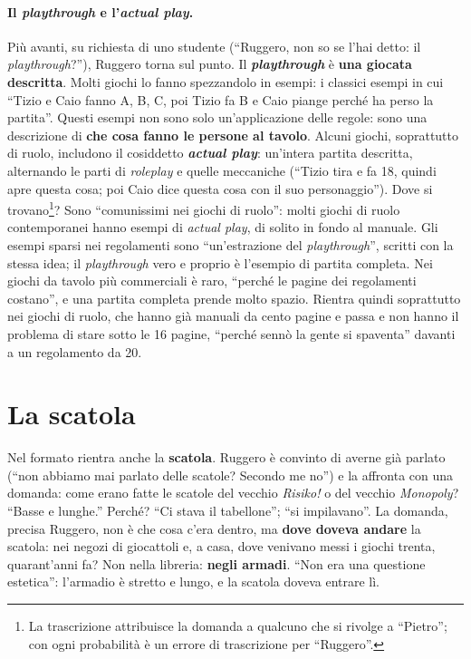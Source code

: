 \paragraph{Il \emph{playthrough} e l'\emph{actual play}.} Più avanti, su richiesta di
uno studente (``Ruggero, non so se l'hai detto: il \emph{playthrough}?''), Ruggero torna
sul punto. Il \textbf{\emph{playthrough}} è \textbf{una giocata descritta}. Molti giochi
lo fanno spezzandolo in esempi: i classici esempi in cui ``Tizio e Caio fanno A, B, C,
poi Tizio fa B e Caio piange perché ha perso la partita''. Questi esempi non sono solo
un'applicazione delle regole: sono una descrizione di \textbf{che cosa fanno le persone
al tavolo}. Alcuni giochi, soprattutto di ruolo, includono il cosiddetto \textbf{\emph{actual
play}}: un'intera partita descritta, alternando le parti di \emph{roleplay} e quelle
meccaniche (``Tizio tira e fa 18, quindi apre questa cosa; poi Caio dice questa cosa con
il suo personaggio''). Dove si trovano\footnote{La trascrizione attribuisce la domanda a
qualcuno che si rivolge a ``Pietro''; con ogni probabilità è un errore di trascrizione
per ``Ruggero''.}? Sono ``comunissimi nei giochi di ruolo'': molti giochi di ruolo
contemporanei hanno esempi di \emph{actual play}, di solito in fondo al manuale. Gli
esempi sparsi nei regolamenti sono ``un'estrazione del \emph{playthrough}'', scritti con
la stessa idea; il \emph{playthrough} vero e proprio è l'esempio di partita completa. Nei
giochi da tavolo più commerciali è raro, ``perché le pagine dei regolamenti costano'', e
una partita completa prende molto spazio. Rientra quindi soprattutto nei giochi di
ruolo, che hanno già manuali da cento pagine e passa e non hanno il problema di stare
sotto le 16 pagine, ``perché sennò la gente si spaventa'' davanti a un regolamento da
20.

\section{La scatola}
\label{a10:sec:scatola}

Nel formato rientra anche la \textbf{scatola}. Ruggero è convinto di averne già parlato
(``non abbiamo mai parlato delle scatole? Secondo me no'') e la affronta con una
domanda: come erano fatte le scatole del vecchio \emph{Risiko!} o del vecchio
\emph{Monopoly}? ``Basse e lunghe.'' Perché? ``Ci stava il tabellone''; ``si impilavano''.
La domanda, precisa Ruggero, non è che cosa c'era dentro, ma \textbf{dove doveva andare}
la scatola: nei negozi di giocattoli e, a casa, dove venivano messi i giochi trenta,
quarant'anni fa? Non nella libreria: \textbf{negli armadi}. ``Non era una questione
estetica'': l'armadio è stretto e lungo, e la scatola doveva entrare lì.

